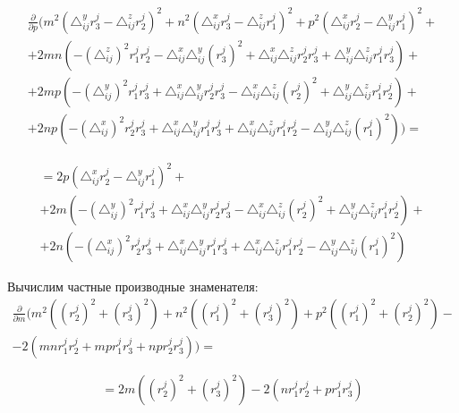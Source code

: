 \vspace{0.5cm}
$$\begin{gathered}
	\frac{\partial}{\partial p} \bigg( m^2 \left( \triangle_{ij}^y r_3^j - \triangle_{ij}^z r_2^j \right)^2 
	+ n^2 \left( \triangle_{ij}^x r_3^j - \triangle_{ij}^z r_1^j \right)^2
	+ p^2 \left( \triangle_{ij}^x r_2^j - \triangle_{ij}^y r_1^j \right)^2 + \\
	+ 2 m n \left( - \left( \triangle_{ij}^z \right)^2 r_1^j r_2^j - \triangle_{ij}^x \triangle_{ij}^y (r_3^j)^2 + \triangle_{ij}^x  \triangle_{ij}^z r_2^j r_3^j + \triangle_{ij}^y  \triangle_{ij}^z r_1^j r_3^j \right) + \\
	+ 2 m p \left( - \left( \triangle_{ij}^y\right)^2 r_1^j r_3^j +  \triangle_{ij}^x \triangle_{ij}^y r_2^j r_3^j -  \triangle_{ij}^x  \triangle_{ij}^z (r_2^j)^2 +  \triangle_{ij}^y  \triangle_{ij}^z r_1^j r_2^j \right) + \\
	+ 2 n p \left( - \left(\triangle_{ij}^x\right)^2 r_2^j r_3^j +  \triangle_{ij}^x \triangle_{ij}^y r_1^j r_3^j +  \triangle_{ij}^x  \triangle_{ij}^z r_1^j r_2^j -  \triangle_{ij}^y  \triangle_{ij}^z (r_1^j)^2 \right) \bigg) = 
\end{gathered}$$

$$\begin{gathered}
	= 2 p \left( \triangle_{ij}^x r_2^j - \triangle_{ij}^y r_1^j \right)^2 + \\
	+ 2 m \left( - \left( \triangle_{ij}^y\right)^2 r_1^j r_3^j +  \triangle_{ij}^x \triangle_{ij}^y r_2^j r_3^j -  \triangle_{ij}^x  \triangle_{ij}^z (r_2^j)^2 +  \triangle_{ij}^y  \triangle_{ij}^z r_1^j r_2^j \right) + \\
	+ 2 n \left( - \left(\triangle_{ij}^x\right)^2 r_2^j r_3^j +  \triangle_{ij}^x \triangle_{ij}^y r_1^j r_3^j +  \triangle_{ij}^x  \triangle_{ij}^z r_1^j r_2^j -  \triangle_{ij}^y  \triangle_{ij}^z (r_1^j)^2 \right)
\end{gathered}$$

Вычислим частные производные знаменателя:
$$\begin{gathered}
	\frac{\partial}{\partial m} \bigg( m^2 \left((r_2^j)^2 + (r_3^j)^2\right) + n^2 \left((r_1^j)^2 + (r_3^j)^2\right) + p^2 \left((r_1^j)^2 + (r_2^j)^2\right) - \\
	- 2 (m n r_1^j r_2^j + m p r_1^j r_3^j + n p r_2^j r_3^j) \bigg) = 
\end{gathered}$$

$$
	= 2 m \left((r_2^j)^2 + (r_3^j)^2\right) - 2 (n r_1^j r_2^j + p r_1^j r_3^j) 
$$

